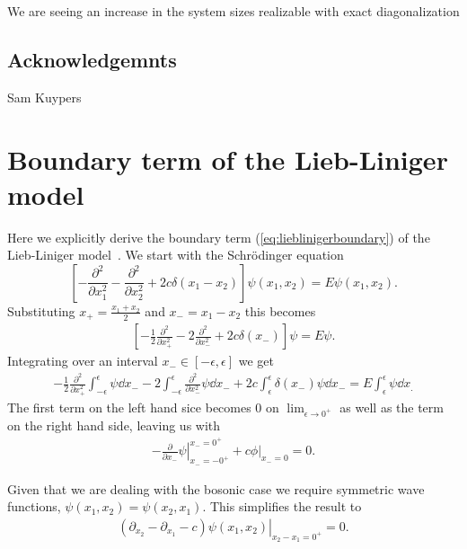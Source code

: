 \documentclass[11pt, a4paper]{report} %
\begin{document}
We are seeing an increase in the system sizes realizable with exact diagonalization \cite{wietek18_sublat_codin_algor_distr_memor}

\section*{Acknowledgemnts}
Sam Kuypers

\appendix

\chapter{Boundary term of the Lieb-Liniger model}\label{cha:boundary}

Here we explicitly derive the boundary term (\cref{eq:lieblinigerboundary}) of the Lieb-Liniger model~\cite{tofind}.
We start with the Schrödinger equation
\begin{equation}
	\left[- \frac{\partial^2}{\partial x_1^2} - \frac{\partial^2}{\partial x_2^2} + 2c \delta(x_1 - x_2)\right] \psi(x_1, x_2) = E \psi(x_1,x_2).
\end{equation} 
Substituting \(x_+ = \frac{x_1+x_2}{2}\) and \(x_-=x_1-x_2\) this becomes
\begin{align}
  \label{eq:17}
  	\left[-\frac{1}{2}\frac{\partial^2}{\partial x_+^2} - 2\frac{\partial^2}{\partial x_-^2} + 2c \delta(x_-)\right] \psi = E\psi.
\end{align}
Integrating over an interval \(x_-\in[-\epsilon,\epsilon]\) we get
\begin{align}
  \label{eq:18}
  -\frac{1}{2} \frac{\partial^2}{\partial x_+^2} \int_{-\epsilon}^{\epsilon} \psi \dd x_- - 2 \int_{-\epsilon}^{\epsilon} \frac{\partial^2}{\partial x_-^2}\psi \dd x_- + 2c\int_{\epsilon}^{\epsilon} \delta(x_-)\psi \dd x_- = E\int_{\epsilon}^{\epsilon} \psi \dd x_.
\end{align}
The first term on the left hand sice becomes 0 on \(\lim_{\epsilon\to0^+}\) as well as the term on the right hand side, leaving us with
\begin{align}
  \label{eq:19}
  \left.- \frac{\partial}{\partial x_-} \psi \right|_{x_-=-0^+}^{x_-=0^+}  + \left.c\phi\right|_{x_-=0} = 0.
\end{align}

Given that we are dealing with the bosonic case we require symmetric wave functions, \(\psi(x_1,x_2)=\psi(x_2,x_1)\).
This simplifies the result to
\begin{align}
  \label{eq:20}
  \left.(\partial_{x_2} - \partial_{x_1} - c) \psi(x_1, x_2)\right|_{x_2-x_1=0^+} = 0.
\end{align}
\end{document}
